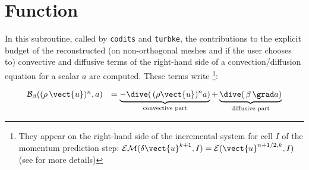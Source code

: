 
%
%
%
%



\vspace{1cm}
\section*{Function}

In this subroutine, called by \texttt{codits} and \texttt{turbke}, the
contributions to the explicit budget of the reconstructed (on
non-orthogonal meshes and if the user chooses to) convective and
diffusive terms of the right-hand side of a convection/diffusion
equation for a scalar $a$ are computed. These terms
write \footnote{They appear on the right-hand side of the incremental
system for cell $I$ of the momentum prediction step:
$\mathcal{EM}(\delta\vect{u}^{k+1},I) =
\mathcal{E}(\vect{u}^{n+1/2,k},I)$  (see  for more details)}:

\begin{equation}\label{Base_Bilsc2_eq_continue}
\begin{array}{ll}
\mathcal{B_{\mathcal{\beta}}}((\rho\,\vect{u})^{n},a)
&=\underbrace{-\dive(\,(\rho \vect{u})^{n}a)}_{\text {convective part}}
+\underbrace{\dive(\,\beta\,\grad a)}_{\text{diffusive part}}\\
\end{array}
\end{equation}

